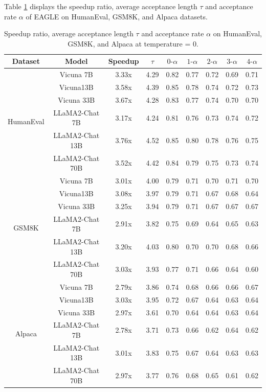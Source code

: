 \documentclass{article}
\theoremstyle{plain}
\theoremstyle{definition}
\theoremstyle{remark}
\begin{document}
Table \ref{tab:a} displays the speedup ratio, average acceptance length $\tau$ and acceptance rate $\alpha$ of EAGLE on HumanEval, GSM8K, and Alpaca datasets.



\begin{table}
  \centering
  \caption{Speedup ratio, average acceptance length $\tau$ and acceptance rate $\alpha$ on HumanEval, GSM8K, and Alpaca at temperature = 0.}
    \begin{tabular}{ccccccccc}
    \toprule
    Dataset & Model & Speedup & $\tau$     & $0\text{-}\alpha$    & $1\text{-}\alpha$    & $2\text{-}\alpha$    & $3\text{-}\alpha$    & $4\text{-}\alpha$ \\
    \midrule
    \multirow{6}[2]{*}{HumanEval} & Vicuna 7B & 3.33x & 4.29  & 0.82  & 0.77  & 0.72  & 0.69  & 0.71 \\
          & Vicuna13B & 3.58x & 4.39  & 0.85  & 0.78  & 0.74  & 0.72  & 0.73 \\
          & Vicuna 33B & 3.67x & 4.28  & 0.83  & 0.77  & 0.74  & 0.70  & 0.70 \\
          & LLaMA2-Chat 7B & 3.17x & 4.24  & 0.81  & 0.76  & 0.73  & 0.74  & 0.72 \\
          & LLaMA2-Chat 13B & 3.76x & 4.52  & 0.85  & 0.80  & 0.78  & 0.76  & 0.75 \\
          & LLaMA2-Chat 70B & 3.52x & 4.42  & 0.84  & 0.79  & 0.75  & 0.73  & 0.74 \\
    \midrule
    \multirow{6}[2]{*}{GSM8K} & Vicuna 7B & 3.01x & 4.00  & 0.79  & 0.71  & 0.70  & 0.71  & 0.70 \\
          & Vicuna13B & 3.08x & 3.97  & 0.79  & 0.71  & 0.67  & 0.68  & 0.64 \\
          & Vicuna 33B & 3.25x & 3.94  & 0.79  & 0.71  & 0.67  & 0.67  & 0.67 \\
          & LLaMA2-Chat 7B & 2.91x & 3.82  & 0.75  & 0.69  & 0.64  & 0.65  & 0.63 \\
          & LLaMA2-Chat 13B & 3.20x & 4.03  & 0.80  & 0.70  & 0.70  & 0.68  & 0.66 \\
          & LLaMA2-Chat 70B & 3.03x & 3.93  & 0.77  & 0.71  & 0.66  & 0.64  & 0.60 \\
    \midrule
    \multirow{6}[2]{*}{Alpaca} & Vicuna 7B & 2.79x & 3.86  & 0.74  & 0.68  & 0.66  & 0.66  & 0.67 \\
          & Vicuna13B & 3.03x & 3.95  & 0.72  & 0.67  & 0.64  & 0.63  & 0.64 \\
          & Vicuna 33B & 2.97x & 3.61  & 0.70  & 0.64  & 0.64  & 0.63  & 0.64 \\
          & LLaMA2-Chat 7B & 2.78x & 3.71  & 0.73  & 0.66  & 0.62  & 0.64  & 0.62 \\
          & LLaMA2-Chat 13B & 3.01x & 3.83  & 0.75  & 0.67  & 0.64  & 0.63  & 0.63 \\
          & LLaMA2-Chat 70B & 2.97x & 3.77  & 0.76  & 0.68  & 0.65  & 0.61  & 0.62 \\
    \bottomrule
    \end{tabular}%
  \label{tab:a}%
\end{table}%
\end{document}
